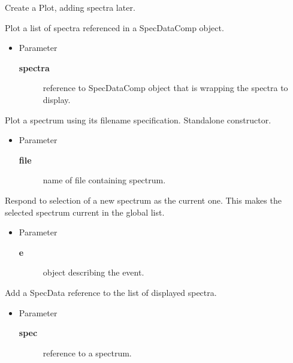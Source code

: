 \constructors
{}
\begin{desc}Create a Plot, adding spectra later.
\end{desc}

\begin{desc}Plot a list of spectra referenced in a SpecDataComp object.
\begin{itemize}
\item{Parameter
  \begin{description}
   \item[\textbf{spectra}]{reference to SpecDataComp object that is
                wrapping the spectra to display.}
  \end{description}}
\end{itemize}
\end{desc}

\begin{desc}Plot a spectrum using its filename specification. Standalone
 constructor.
\begin{itemize}
\item{Parameter
  \begin{description}
   \item[\textbf{file}]{name of file containing spectrum.}
  \end{description}}
\end{itemize}
\end{desc}

\methods
{}
\begin{desc}Respond to selection of a new spectrum as the current one. This
 makes the selected spectrum current in the global list.
\begin{itemize}
\item{Parameter
  \begin{description}
   \item[\textbf{e}]{object describing the event.}
  \end{description}}
\end{itemize}
\end{desc}

\begin{desc}Add a SpecData reference to the list of displayed spectra.
\begin{itemize}
\item{Parameter
  \begin{description}
   \item[\textbf{spec}]{reference to a spectrum.}
  \end{description}}
\end{itemize}
\end{desc}

